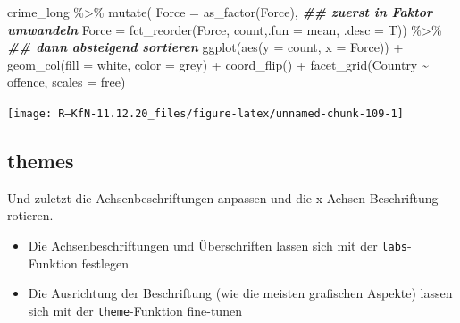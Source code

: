 \documentclass[
]{book}
\newenvironment{Shaded}{\begin{snugshade}}{\end{snugshade}}
\newcommand{\AttributeTok}[1]{\textcolor[rgb]{0.77,0.63,0.00}{#1}}
\newcommand{\DocumentationTok}[1]{\textcolor[rgb]{0.56,0.35,0.01}{\textbf{\textit{#1}}}}
\newcommand{\FunctionTok}[1]{\textcolor[rgb]{0.00,0.00,0.00}{#1}}
\newcommand{\NormalTok}[1]{#1}
\newcommand{\SpecialCharTok}[1]{\textcolor[rgb]{0.00,0.00,0.00}{#1}}
\newcommand{\StringTok}[1]{\textcolor[rgb]{0.31,0.60,0.02}{#1}}
\begin{document}
\begin{Shaded}
\begin{Highlighting}[]
\NormalTok{crime\_long }\SpecialCharTok{\%\textgreater{}\%} 
  \FunctionTok{mutate}\NormalTok{(}
      \AttributeTok{Force =} \FunctionTok{as\_factor}\NormalTok{(Force), }\DocumentationTok{\#\# zuerst in Faktor umwandeln}
      \AttributeTok{Force =} \FunctionTok{fct\_reorder}\NormalTok{(Force, count,}\AttributeTok{.fun =}\NormalTok{ mean, }\AttributeTok{.desc =}\NormalTok{ T)) }\SpecialCharTok{\%\textgreater{}\%} \DocumentationTok{\#\# dann absteigend sortieren}
\FunctionTok{ggplot}\NormalTok{(}\FunctionTok{aes}\NormalTok{(}\AttributeTok{y =}\NormalTok{ count,}
             \AttributeTok{x =}\NormalTok{ Force)) }\SpecialCharTok{+}
  \FunctionTok{geom\_col}\NormalTok{(}\AttributeTok{fill =} \StringTok{\textquotesingle{}white\textquotesingle{}}\NormalTok{,}
           \AttributeTok{color =} \StringTok{\textquotesingle{}grey\textquotesingle{}}\NormalTok{) }\SpecialCharTok{+}
  \FunctionTok{coord\_flip}\NormalTok{() }\SpecialCharTok{+}
  \FunctionTok{facet\_grid}\NormalTok{(Country }\SpecialCharTok{\textasciitilde{}}\NormalTok{ offence, }
             \AttributeTok{scales =} \StringTok{\textquotesingle{}free\textquotesingle{}}\NormalTok{)}
\end{Highlighting}
\end{Shaded}

\begin{center}\texttt{[image: R---KfN-11.12.20\_files/figure-latex/unnamed-chunk-109-1]} \end{center}

\hypertarget{themes}{%
\subsection{themes}\label{themes}}

Und zuletzt die Achsenbeschriftungen anpassen und die x-Achsen-Beschriftung rotieren.

\begin{itemize}
\item
  Die Achsenbeschriftungen und Überschriften lassen sich mit der \texttt{labs}-Funktion festlegen
\item
  Die Ausrichtung der Beschriftung (wie die meisten grafischen Aspekte) lassen sich mit der \texttt{theme}-Funktion fine-tunen
\end{itemize}
\end{document}
